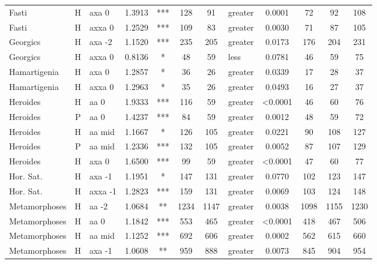 \documentclass[twocolumn, switch]{article} %
\begin{document}
\begin{table}[h!]
\begin{adjustbox}{totalheight=0.9\textheight}
\begin{tabular}{lclcccclcc@{\hspace{1\tabcolsep}}c@{\hspace{1\tabcolsep}}c}
         Fasti &     H &     axa 0 & 1.3913 &   *** &   128 &        91 &     greater & 0.0001 &    72 &    92 &   108 \\
         Fasti &     H &    axxa 0 & 1.2529 &   *** &   109 &        83 &     greater & 0.0030 &    71 &    87 &   105 \\
      Georgics &     H &    axa -2 & 1.1520 &   *** &   235 &       205 &     greater & 0.0173 &   176 &   204 &   231 \\
      Georgics &     H &    axxa 0 & 0.8136 &     * &    48 &        59 &        less & 0.0781 &    46 &    59 &    75 \\
  Hamartigenia &     H &     axa 0 & 1.2857 &     * &    36 &        26 &     greater & 0.0339 &    17 &    28 &    37 \\
  Hamartigenia &     H &    axxa 0 & 1.2963 &     * &    35 &        26 &     greater & 0.0493 &    16 &    27 &    37 \\
      Heroides &     H &      aa 0 & 1.9333 &   *** &   116 &        59 &     greater & <0.0001 &    46 &    60 &    76 \\
      Heroides &     P &      aa 0 & 1.4237 &   *** &    84 &        59 &     greater & 0.0012 &    48 &    59 &    72 \\
      Heroides &     H &    aa mid & 1.1667 &     * &   126 &       105 &     greater & 0.0221 &    90 &   108 &   127 \\
      Heroides &     P &    aa mid & 1.2336 &   *** &   132 &       105 &     greater & 0.0052 &    87 &   107 &   129 \\
      Heroides &     H &     axa 0 & 1.6500 &   *** &    99 &        59 &     greater & <0.0001 &    47 &    60 &    77 \\
     Hor. Sat. &     H &    axa -1 & 1.1951 &     * &   147 &       131 &     greater & 0.0770 &   102 &   123 &   147 \\
     Hor. Sat. &     H &   axxa -1 & 1.2823 &   *** &   159 &       131 &     greater & 0.0069 &   103 &   124 &   148 \\
 Metamorphoses &     H &     aa -2 & 1.0684 &    ** &  1234 &      1147 &     greater & 0.0038 &  1098 &  1155 &  1230 \\
 Metamorphoses &     H &      aa 0 & 1.1842 &   *** &   553 &       465 &     greater & <0.0001 &   418 &   467 &   506 \\
 Metamorphoses &     H &    aa mid & 1.1252 &   *** &   692 &       606 &     greater & 0.0002 &   562 &   615 &   660 \\
 Metamorphoses &     H &    axa -1 & 1.0608 &    ** &   959 &       888 &     greater & 0.0073 &   845 &   904 &   954 \\

\end{tabular}
\end{adjustbox}
\end{table}
\end{document}
